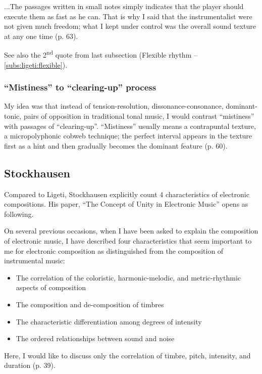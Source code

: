 \documentclass[a4paper,11pt]{article}
\newenvironment{MyShadequote}[1][]{%
    \ignorespaces%
    \begin{mdframed}[style=MyShadeQuoteStyle,#1]%
}{%
    \end{mdframed}%
    \ignorespacesafterend%
}%
\begin{document}
\begin{MyShadequote}
  ...The passages written in small notes simply indicates that the player should execute them as fast as he can.
  That is why I said that the instrumentalist were not given much freedom; what I kept under control was the overall sound texture at any one time (p. 63).
\end{MyShadequote}

See also the 2\textsuperscript{nd} quote from last subsection (Flexible rhythm -- \ref{subs:ligeti:flexible}).

\subsubsection{``Mistiness'' to ``clearing-up'' process}
\label{subs:ligeti:mistiness}

\begin{MyShadequote}
  My idea was that instead of tension-resolution, dissonance-consonance, dominant-tonic, pairs of opposition in traditional tonal music, I would contrast ``mistiness'' with passages of ``clearing-up''. ``Mistiness'' usually means a contrapuntal texture, a micropolyphonic cobweb technique; the perfect interval appears in the texture first as a hint and then gradually becomes the dominant feature (p. 60).
\end{MyShadequote}

\subsection{Stockhausen}
\label{sub:eshtetic_stockhausen}

Compared to Ligeti, Stockhausen explicitly count 4 characteristics of electronic compositions.
His paper, ``The Concept of Unity in Electronic Music'' opens as following.

\begin{MyShadequote}
  On several previous occasions, when I have been asked to explain the composition of electronic music, I have described four characteristics that seem important to me for electronic composition as distinguished from the composition of instrumental music:

  \begin{itemize}
    \item The correlation of the coloristic, harmonic-melodic, and metric-rhythmic aspects of composition
    \item The composition and de-composition of timbres
    \item The characteristic differentiation among degrees of intensity
    \item The ordered relationships between sound and noise
  \end{itemize}

  Here, I would like to discuss only the correlation of timbre, pitch, intensity, and duration (p. 39).
\end{MyShadequote}
\end{document}
